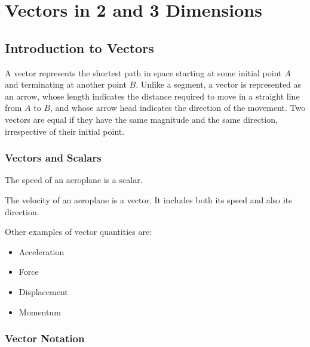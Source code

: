 \documentclass[11pt,a4paper]{book}
\begin{document}
\tableofcontents

\setcounter{chapter}{12}

\chapter{Vectors in 2 and 3 Dimensions}


\section{Introduction to Vectors}

A vector represents the shortest path in space starting at some initial
point $A$ and terminating at another point $B$. Unlike a segment,
a vector is represented as an arrow, whose length indicates the distance
required to move in a straight line from $A$ to $B$, and whose arrow
head indicates the direction of the movement. Two vectors are equal
if they have the same magnitude and the same direction, irrespective
of their initial point.

\subsection{Vectors and Scalars}
\begin{center}
\par\end{center}

The speed of an aeroplane is a scalar.

The velocity of an aeroplane is a vector. It includes both its speed
and also its direction.

Other examples of vector quantities are:
\begin{itemize}
\item Acceleration
\item Force
\item Displacement
\item Momentum
\end{itemize}

\subsection{Vector Notation}
\end{document}

